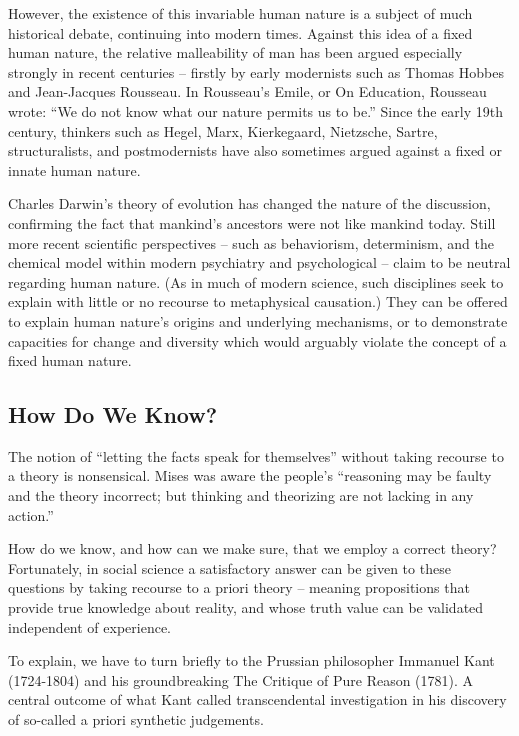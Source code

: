 However, the existence of this invariable human nature is a subject of much historical debate, continuing into modern times. Against this idea of a fixed human nature, the relative malleability of man has been argued especially strongly in recent centuries – firstly by early modernists such as Thomas Hobbes and Jean-Jacques Rousseau. In Rousseau’s Emile, or On Education, Rousseau wrote: “We do not know what our nature permits us to be.”  Since the early 19th century, thinkers such as Hegel, Marx, Kierkegaard, Nietzsche, Sartre, structuralists, and postmodernists have also sometimes argued against a fixed or innate human nature.

Charles Darwin’s theory of evolution has changed the nature of the discussion, confirming the fact that mankind’s ancestors were not like mankind today. Still more recent scientific perspectives – such as behaviorism, determinism, and the chemical model within modern psychiatry and psychological – claim to be neutral regarding human nature. (As in much of modern science, such disciplines seek to explain with little or no recourse to metaphysical causation.)  They can be offered to explain human nature’s origins and underlying mechanisms, or to demonstrate capacities for change and diversity which would arguably violate the concept of a fixed human nature.

\subsection{How Do We Know?}

The notion of ``letting the facts speak for themselves'' without taking recourse to a theory is nonsensical. Mises was aware the people’s ``reasoning may be faulty and the theory incorrect; but thinking and theorizing are not lacking in any action.''

How do we know, and how can we make sure, that we employ a correct theory?  Fortunately, in social science a satisfactory answer can be given to these questions by taking recourse to a priori theory – meaning propositions that provide true knowledge about reality, and whose truth value can be validated independent of experience.

To explain, we have to turn briefly to the Prussian philosopher Immanuel Kant (1724-1804) and his groundbreaking The Critique of Pure Reason (1781). A central outcome of what Kant called transcendental investigation in his discovery of so-called a priori synthetic judgements.
    
